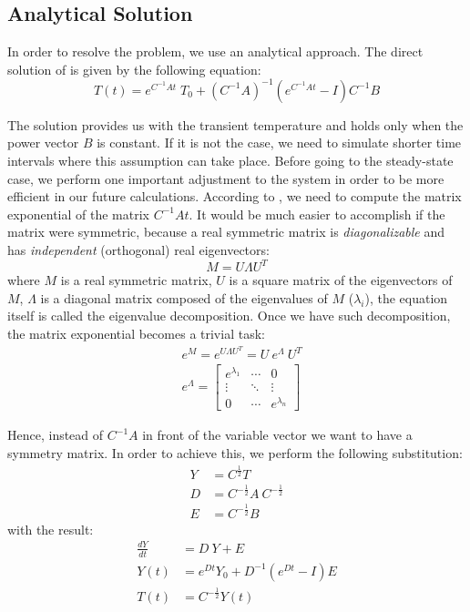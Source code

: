 \subsection{Analytical Solution}
In order to resolve the problem, we use an analytical approach. The direct solution of  is given by the following equation:
\begin{equation} \label{eq:solution}
  T(t) = e^{C^{-1}A t} \; T_0 + (C^{-1} A)^{-1}(e^{C^{-1}A t} - I)C^{-1} B
\end{equation}

The solution provides us with the transient temperature and holds only when the power vector $B$ is constant. If it is not the case, we need to simulate shorter time intervals where this assumption can take place. Before going to the steady-state case, we perform one important adjustment to the system in order to be more efficient in our future calculations. According to , we need to compute the matrix exponential of the matrix $C^{-1} A t$. It would be much easier to accomplish if the matrix were symmetric, because a real symmetric matrix is \emph{diagonalizable} and has \emph{independent} (orthogonal) real eigenvectors:
\begin{equation} \label{eq:eigenvalue-decomposition}
  M = U \Lambda U^T
\end{equation}
where $M$ is a real symmetric matrix, $U$ is a square matrix of the eigenvectors of $M$, $\Lambda$ is a diagonal matrix composed of the eigenvalues of $M$ ($\lambda_i$), the equation itself is called the eigenvalue decomposition. Once we have such decomposition, the matrix exponential becomes a trivial task:
\begin{align}
  & e^M = e^{U \Lambda U^T} = U \: e^{\Lambda} \: U^T \nonumber \\
  & e^{\Lambda} = \left[
      \begin{array}{ccc}
        e^{\lambda_1} & \cdots & 0 \\
        \vdots & \ddots & \vdots \\
        0 & \cdots & e^{\lambda_{n}}
      \end{array}
    \right] \nonumber
\end{align}

Hence, instead of $C^{-1} A$ in front of the variable vector we want to have a symmetry matrix. In order to achieve this, we perform the following substitution:
\begin{align*}
  Y & = C^{\frac{1}{2}} T \\
  D & = C^{-\frac{1}{2}} A \: C^{-\frac{1}{2}} \\
  E & = C^{-\frac{1}{2}} B
\end{align*}
with the result:
\begin{align}
  \frac{dY}{dt} & = D \: Y + E \nonumber \\
  Y(t) & = e^{D t} Y_0 + D^{-1} (e^{D t} - I) E \label{eq:modified-solution} \\
  T(t) & = C^{-\frac{1}{2}} Y(t) \label{eq:finalization}
\end{align}

